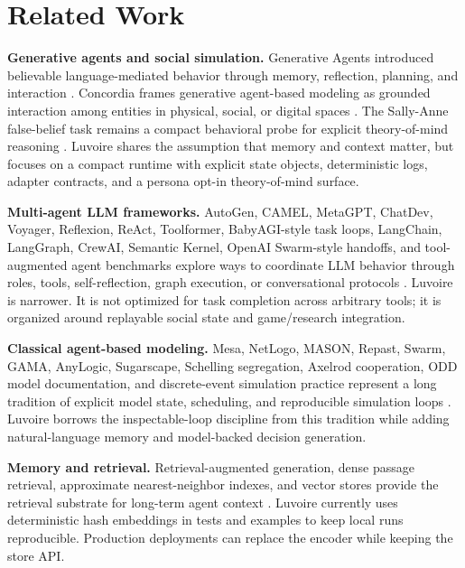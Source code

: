\section{Related Work}

\textbf{Generative agents and social simulation.} Generative Agents introduced believable language-mediated behavior through memory, reflection, planning, and interaction \cite{park2023generative}. Concordia frames generative agent-based modeling as grounded interaction among entities in physical, social, or digital spaces \cite{vezhnevets2023concordia}. The Sally-Anne false-belief task remains a compact behavioral probe for explicit theory-of-mind reasoning \cite{wimmer1983belief,baroncohen1985does}. Luvoire shares the assumption that memory and context matter, but focuses on a compact runtime with explicit state objects, deterministic logs, adapter contracts, and a persona opt-in theory-of-mind surface.

\textbf{Multi-agent LLM frameworks.} AutoGen, CAMEL, MetaGPT, ChatDev, Voyager, Reflexion, ReAct, Toolformer, BabyAGI-style task loops, LangChain, LangGraph, CrewAI, Semantic Kernel, OpenAI Swarm-style handoffs, and tool-augmented agent benchmarks explore ways to coordinate LLM behavior through roles, tools, self-reflection, graph execution, or conversational protocols \cite{wu2023autogen,li2023camel,hong2023metagpt,qian2023chatdev,wang2023voyager,shinn2023reflexion,yao2023react,schick2023toolformer,liu2023agentbench}. Luvoire is narrower. It is not optimized for task completion across arbitrary tools; it is organized around replayable social state and game/research integration.

\textbf{Classical agent-based modeling.} Mesa, NetLogo, MASON, Repast, Swarm, GAMA, AnyLogic, Sugarscape, Schelling segregation, Axelrod cooperation, ODD model documentation, and discrete-event simulation practice represent a long tradition of explicit model state, scheduling, and reproducible simulation loops \cite{terhoeven2025mesa,wilensky1999netlogo,luke2005mason,north2013complex,daniels1999swarm,taillandier2019gama,borshchev2013anylogic,epstein1996growing,schelling1971dynamic,axelrod1984evolution,grimm2006standard,law2014simulation}. Luvoire borrows the inspectable-loop discipline from this tradition while adding natural-language memory and model-backed decision generation.

\textbf{Memory and retrieval.} Retrieval-augmented generation, dense passage retrieval, approximate nearest-neighbor indexes, and vector stores provide the retrieval substrate for long-term agent context \cite{lewis2020rag,karpukhin2020dpr,johnson2017faiss,malkov2020hnswlib,guo2020scann}. Luvoire currently uses deterministic hash embeddings in tests and examples to keep local runs reproducible. Production deployments can replace the encoder while keeping the store API.

